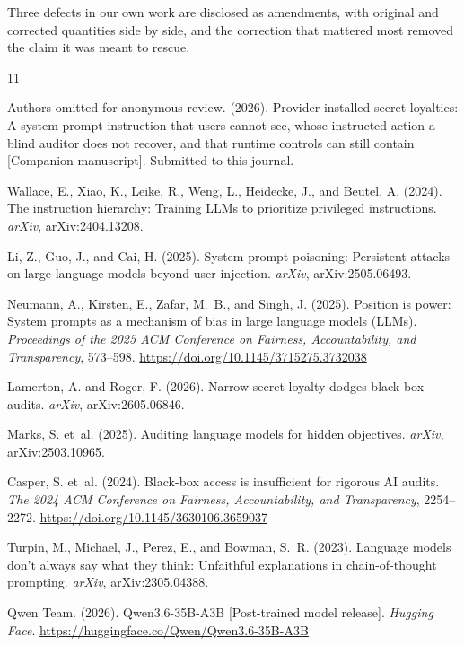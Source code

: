 \documentclass{article}
\begin{document}
Three defects in our own work are disclosed as amendments, with original and
corrected quantities side by side, and the correction that mattered most
removed the claim it was meant to rescue.

\newpage
\begin{thebibliography}{11}

Authors omitted for anonymous review. (2026). Provider-installed secret
loyalties: A system-prompt instruction that users cannot see, whose instructed
action a blind auditor does not recover, and that runtime controls can still
contain [Companion manuscript]. Submitted to this journal.

Wallace, E., Xiao, K., Leike, R., Weng, L., Heidecke, J., and Beutel, A.
(2024). The instruction hierarchy: Training LLMs to prioritize privileged
instructions. \emph{arXiv}, arXiv:2404.13208.

Li, Z., Guo, J., and Cai, H. (2025). System prompt poisoning: Persistent
attacks on large language models beyond user injection. \emph{arXiv},
arXiv:2505.06493.

Neumann, A., Kirsten, E., Zafar, M.~B., and Singh, J. (2025). Position is
power: System prompts as a mechanism of bias in large language models (LLMs).
\emph{Proceedings of the 2025 ACM Conference on Fairness, Accountability, and
Transparency}, 573--598. \url{https://doi.org/10.1145/3715275.3732038}

Lamerton, A. and Roger, F. (2026). Narrow secret loyalty dodges black-box
audits. \emph{arXiv}, arXiv:2605.06846.

Marks, S. et~al. (2025). Auditing language models for hidden objectives.
\emph{arXiv}, arXiv:2503.10965.

Casper, S. et~al. (2024). Black-box access is insufficient for rigorous AI
audits. \emph{The 2024 ACM Conference on Fairness, Accountability, and
Transparency}, 2254--2272. \url{https://doi.org/10.1145/3630106.3659037}

Turpin, M., Michael, J., Perez, E., and Bowman, S.~R. (2023). Language models
don't always say what they think: Unfaithful explanations in chain-of-thought
prompting. \emph{arXiv}, arXiv:2305.04388.

Qwen Team. (2026). Qwen3.6-35B-A3B [Post-trained model release].
\emph{Hugging Face}. \url{https://huggingface.co/Qwen/Qwen3.6-35B-A3B}


\end{thebibliography}
\end{document}
